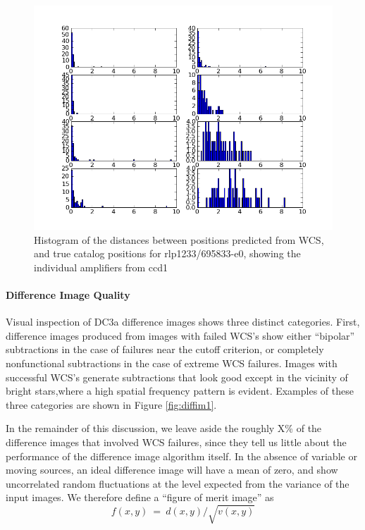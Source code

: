 \begin{figure}[hb]
\begin{center}
\includegraphics{images/rlp1233_ccd1_match.png}
\caption{Histogram of the distances between positions predicted from WCS, and
  true catalog positions for rlp1233/695833-e0, showing the individual
amplifiers from ccd1}  
\label{fig:wcs2}
\end{center}
\end{figure}




\paragraph{Difference Image Quality}

Visual inspection of DC3a difference images shows three distinct
categories. First, difference images produced from images with failed 
WCS's show either ``bipolar'' subtractions in the case of failures
near the cutoff criterion, or completely nonfunctional subtractions in
the case of extreme WCS failures.  Images with successful WCS's
generate subtractions that look good except in the vicinity of bright
stars,where a high spatial frequency pattern is evident.  Examples of
these three categories are shown in Figure \ref{fig:diffim1}.

In the remainder of this discussion, we leave aside the roughly X\% of
the difference images that involved WCS failures, since they tell us
little about the performance of the difference image algorithm itself.
In the absence of variable or moving sources, an ideal difference
image will have a mean of zero, and show uncorrelated random
fluctuations at the level expected from the variance of the input
images.  We therefore define a ``figure of merit image'' as
\begin{equation}
f(x,y)~=~d(x,y)/\sqrt {v(x,y)}
\end{equation} 


